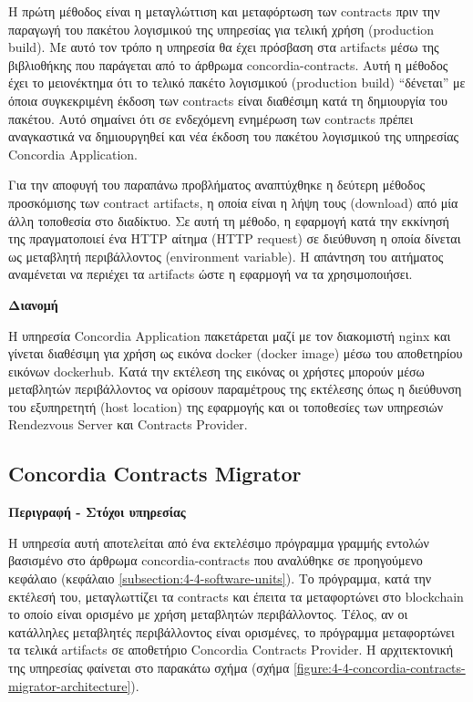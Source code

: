 Η πρώτη μέθοδος είναι η μεταγλώττιση και μεταφόρτωση των contracts πριν την παραγωγή του πακέτου λογισμικού της υπηρεσίας για τελική χρήση (production build). Με αυτό τον τρόπο η υπηρεσία θα έχει πρόσβαση στα artifacts μέσω της βιβλιοθήκης που παράγεται από το άρθρωμα concordia-contracts. Αυτή η μέθοδος έχει το μειονέκτημα ότι το τελικό πακέτο λογισμικού (production build) ``δένεται'' με όποια συγκεκριμένη έκδοση των contracts είναι διαθέσιμη κατά τη δημιουργία του πακέτου. Αυτό σημαίνει ότι σε ενδεχόμενη ενημέρωση των contracts πρέπει αναγκαστικά να δημιουργηθεί και νέα έκδοση του πακέτου λογισμικού της υπηρεσίας Concordia Application.

Για την αποφυγή του παραπάνω προβλήματος αναπτύχθηκε η δεύτερη μέθοδος προσκόμισης των contract artifacts, η οποία είναι η λήψη τους (download) από μία άλλη τοποθεσία στο διαδίκτυο. Σε αυτή τη μέθοδο, η εφαρμογή κατά την εκκίνησή της πραγματοποιεί ένα HTTP αίτημα (HTTP request) σε διεύθυνση η οποία δίνεται ως μεταβλητή περιβάλλοντος (environment variable). Η απάντηση του αιτήματος αναμένεται να περιέχει τα artifacts ώστε η εφαρμογή να τα χρησιμοποιήσει.

\vspace{0.5cm}
\textbf{Διανομή}

Η υπηρεσία Concordia Application πακετάρεται μαζί με τον διακομιστή nginx και γίνεται διαθέσιμη για χρήση ως εικόνα docker (docker image) μέσω του αποθετηρίου εικόνων dockerhub. Κατά την εκτέλεση της εικόνας οι χρήστες μπορούν μέσω μεταβλητών περιβάλλοντος να ορίσουν παραμέτρους της εκτέλεσης όπως η διεύθυνση του εξυπηρετητή (host location) της εφαρμογής και οι τοποθεσίες των υπηρεσιών Rendezvous Server και Contracts Provider.

\subsection{Concordia Contracts Migrator} \label{subsection:4-4-concordia-contracts-migrator}

\vspace{0.5cm}
\textbf{Περιγραφή - Στόχοι υπηρεσίας}

Η υπηρεσία αυτή αποτελείται από ένα εκτελέσιμο πρόγραμμα γραμμής εντολών βασισμένο στο άρθρωμα concordia-contracts που αναλύθηκε σε προηγούμενο κεφάλαιο (κεφάλαιο \ref{subsection:4-4-software-units}). Το πρόγραμμα, κατά την εκτέλεσή του, μεταγλωττίζει τα contracts και έπειτα τα μεταφορτώνει στο blockchain το οποίο είναι ορισμένο με χρήση μεταβλητών περιβάλλοντος. Τέλος, αν οι κατάλληλες μεταβλητές περιβάλλοντος είναι ορισμένες, το πρόγραμμα μεταφορτώνει τα τελικά artifacts σε αποθετήριο Concordia Contracts Provider. Η αρχιτεκτονική της υπηρεσίας φαίνεται στο παρακάτω σχήμα (σχήμα \ref{figure:4-4-concordia-contracts-migrator-architecture}).

